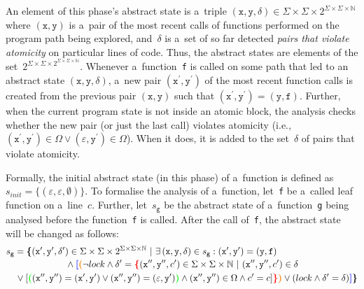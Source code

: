 An element of this phase's abstract state is a~triple $ (\mathtt{x}, \mathtt{y}, \delta) \in \Sigma \times \Sigma \times 2^{\Sigma \times \Sigma \times \mathbb{N}} $ where $ (\mathtt{x}, \mathtt{y}) $ is a~pair of the most recent calls of functions performed on the program path being explored, and~$ \delta $ is a~set of so far detected \emph{pairs that violate atomicity} on particular lines of code. Thus, the abstract states are elements of the set~$ 2^{\Sigma \times \Sigma \times 2^{\Sigma \times \Sigma \times \mathbb{N}}} $. Whenever a~function~\texttt{f} is called on some path that led to an abstract state $ (\mathtt{x}, \mathtt{y}, \delta) $, a~new pair $ (\mathtt{x}^\prime, \mathtt{y}^\prime) $ of the most recent function calls is created from the previous pair $ (\mathtt{x}, \mathtt{y}) $ such that $ (\mathtt{x}^\prime, \mathtt{y}^\prime) = (\mathtt{y}, \mathtt{f}) $. Further, when the current program state is not inside an atomic block, the analysis checks whether the new pair (or just the last call) violates atomicity (i.e., $ (\mathtt{x}^\prime, \mathtt{y}^\prime) \in \Omega \vee (\varepsilon, \mathtt{y}^\prime) \in \Omega $). When it does, it is added to the set~$ \delta $ of pairs that violate atomicity.

Formally, the initial abstract state (in this phase) of a~function is defined as $ s_{init} = \{(\varepsilon, \varepsilon, \emptyset)\} $. To formalise the analysis of a~function, let~\texttt{f} be a~called leaf function on a~line~$ c $. Further, let~$ s_\mathtt{g} $ be the abstract state of a~function~\texttt{g} being analysed before the function~\texttt{f} is called. After the call of~\texttt{f}, the abstract state will be changed as follows:
$$
\begin{multlined}
    s_\mathtt{g} = \bb{\{}(\mathtt{x}^\prime, \mathtt{y}^\prime, \delta^\prime) \in \Sigma \times \Sigma \times 2^{\Sigma \times \Sigma \times \mathbb{N}}\ |\ \exists\,(\mathtt{x}, \mathtt{y}, \delta) \in s_\mathtt{g} : (\mathtt{x}^\prime, \mathtt{y}^\prime) = (\mathtt{y}, \mathtt{f}) \\
%
    \wedge \bA{[}\bB{(}\neg lock \wedge \delta^\prime = \bC{\{}(\mathtt{x}^{\prime\prime}, \mathtt{y}^{\prime\prime}, c^\prime) \in \Sigma \times \Sigma \times \mathbb{N}\ |\ (\mathtt{x}^{\prime\prime}, \mathtt{y}^{\prime\prime}, c^\prime) \in \delta \\
%
    \vee [\bD{(}(\mathtt{x}^{\prime\prime}, \mathtt{y}^{\prime\prime}) = (\mathtt{x}^{\prime}, \mathtt{y}^\prime) \vee (\mathtt{x}^{\prime\prime}, \mathtt{y}^{\prime\prime}) = (\varepsilon, \mathtt{y}^\prime)\bD{)} \wedge (\mathtt{x}^{\prime\prime}, \mathtt{y}^{\prime\prime}) \in \Omega \wedge c^\prime = c]\bC{\}}\bB{)} \vee (lock \wedge \delta^\prime = \delta)%
%
    \bA{]}\bb{\}}
\end{multlined}
$$

